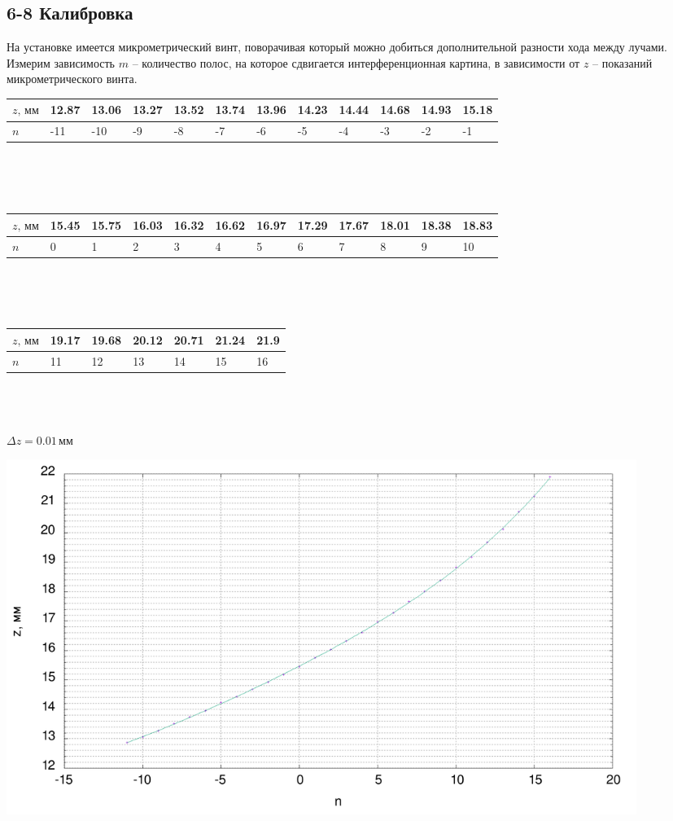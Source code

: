 \documentclass[a4paper,12pt]{article}
\begin{document}
\subsection*{6-8 Калибровка}
На установке имеется микрометрический винт, поворачивая который можно добиться дополнительной разности хода между лучами. Измерим зависимость $m$ -- количество полос, на которое сдвигается интерференционная картина, в зависимости от $z$ -- показаний микрометрического винта.

\begin{center}
\begin{tabular}{|l|l|l|l|l|l|l|l|l|l|l|l|}
\hline
$z,\,\text{мм}$ & 12.87 & 13.06 & 13.27 & 13.52 & 13.74 & 13.96 & 14.23 & 14.44 & 14.68 & 14.93 & 15.18 \\ \hline
$n$             & -11   & -10   & -9    & -8    & -7    & -6    & -5    & -4    & -3    & -2    & -1    \\ \hline
\end{tabular}\\~\\~\\

\begin{tabular}{|l|l|l|l|l|l|l|l|l|l|l|l|}
\hline
$z,\,\text{мм}$ & 15.45 & 15.75 & 16.03 & 16.32 & 16.62 & 16.97 & 17.29 & 17.67 & 18.01 & 18.38 & 18.83 \\ \hline
$n$             & 0     & 1     & 2     & 3     & 4     & 5     & 6     & 7     & 8     & 9     & 10    \\ \hline
\end{tabular}\\~\\~\\

\begin{tabular}{|l|l|l|l|l|l|l|}
\hline
$z,\,\text{мм}$ & 19.17 & 19.68 & 20.12 & 20.71 & 21.24 & 21.9 \\ \hline
$n$             & 11    & 12    & 13    & 14    & 15    & 16   \\ \hline
\end{tabular}\\~\\~\\

$\Delta z = 0.01\,\text{мм}$

\end{center}

\begin{center}
\includegraphics[width=0.90\textwidth]{1.png}
\end{center}
\end{document}
